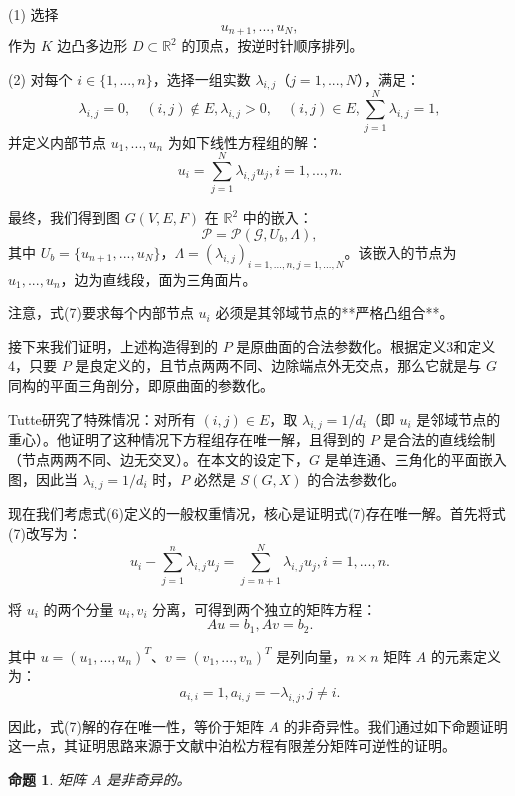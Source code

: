 \documentclass{ctexart}
\newtheorem{proposition}{命题}
\theoremstyle{proof}
\begin{document}
(1) 选择
\[
u_{n+1}, ..., u_{N}, \tag{5}
\]
作为 $K$ 边凸多边形 $D \subset \mathbb{R}^2$ 的顶点，按逆时针顺序排列。

(2) 对每个 $i \in \{1,...,n\}$，选择一组实数 $\lambda_{i,j}$（$j=1,...,N$），满足：
\[
\lambda_{i, j}=0, \quad(i, j) \notin E, \lambda_{i, j}>0, \quad(i, j) \in E, \sum_{j=1}^{N} \lambda_{i, j}=1, \tag{6}
\]
并定义内部节点 $u_1,...,u_n$ 为如下线性方程组的解：
\[
u_{i}=\sum_{j=1}^{N} \lambda_{i, j} u_{j}, i=1, ..., n . \tag{7}
\]

最终，我们得到图 $G(V,E,F)$ 在 $\mathbb{R}^2$ 中的嵌入：
\[
\mathcal {P}=\mathcal {P}(\mathcal {G},U_{b},\Lambda ),
\]
其中 $U_{b}=\{ u_{n+1},... ,u_{N}\}$，$\Lambda =(\lambda _{i,j})_{i=1,... ,n, j=1,... ,N}$。该嵌入的节点为 $u_1,...,u_n$，边为直线段，面为三角面片。

注意，式(7)要求每个内部节点 $u_i$ 必须是其邻域节点的**严格凸组合**。

接下来我们证明，上述构造得到的 $P$ 是原曲面的合法参数化。根据定义3和定义4，只要 $P$ 是良定义的，且节点两两不同、边除端点外无交点，那么它就是与 $G$ 同构的平面三角剖分，即原曲面的参数化。

Tutte\cite{tutte1963}研究了特殊情况：对所有 $(i,j) \in E$，取 $\lambda_{i,j}=1/d_i$（即 $u_i$ 是邻域节点的重心）。他证明了这种情况下方程组存在唯一解，且得到的 $P$ 是合法的直线绘制（节点两两不同、边无交叉）。在本文的设定下，$G$ 是单连通、三角化的平面嵌入图，因此当 $\lambda_{i,j}=1/d_i$ 时，$P$ 必然是 $S(G,X)$ 的合法参数化。

现在我们考虑式(6)定义的一般权重情况，核心是证明式(7)存在唯一解。首先将式(7)改写为：
\[
u_{i}-\sum_{j=1}^{n} \lambda_{i, j} u_{j}=\sum_{j=n+1}^{N} \lambda_{i, j} u_{j}, i=1, ..., n . \tag{8}
\]

将 $u_i$ 的两个分量 $u_i, v_i$ 分离，可得到两个独立的矩阵方程：
\[
A u=b_{1}, A v=b_{2} . \tag{9}
\]

其中 $u=(u_1,...,u_n)^T$、$v=(v_1,...,v_n)^T$ 是列向量，$n \times n$ 矩阵 $A$ 的元素定义为：
\[
a_{i,i}=1, a_{i,j}=-\lambda _{i,j}, j\neq i. \tag{10}
\]

因此，式(7)解的存在唯一性，等价于矩阵 $A$ 的非奇异性。我们通过如下命题证明这一点，其证明思路来源于文献\cite{atkinson1989}中泊松方程有限差分矩阵可逆性的证明。

\begin{proposition}
矩阵 $A$ 是非奇异的。
\end{proposition}
\end{document}
